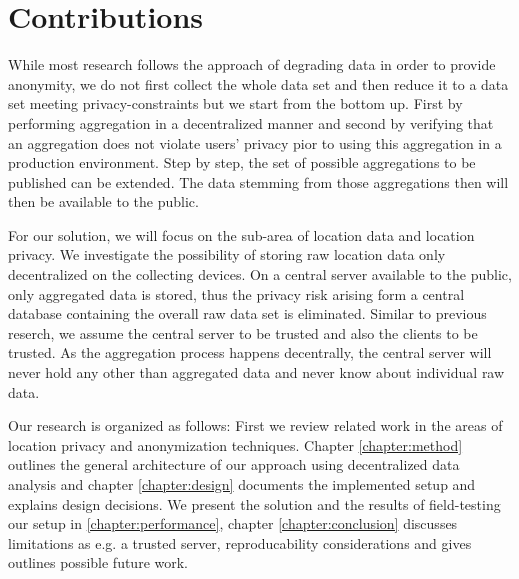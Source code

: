 \section{Contributions}
While most research follows the approach of degrading data in order to provide anonymity, we do not first collect the whole data set and then reduce it to a data set meeting privacy-constraints but we start from the bottom up. First by performing aggregation in a decentralized manner and second by verifying that an aggregation does not violate users' privacy pior to using this aggregation in a production environment. Step by step, the set of possible aggregations to be published can be extended. The data stemming from those aggregations then will then be available to the public. 

For our solution, we will focus on the sub-area of location data and location privacy.
We investigate the possibility of storing raw location data only decentralized on the collecting devices. On a central server available to the public, only aggregated data is stored, thus the privacy risk arising form a central database containing the overall raw data set is eliminated. Similar to previous reserch, we assume the central server to be trusted and also the clients to be trusted. As the aggregation process happens decentrally, the central server will never hold any other than aggregated data and never know about individual raw data. 

Our research is organized as follows: First we review related work in the areas of location privacy and anonymization techniques.
Chapter \ref{chapter:method} outlines the general architecture of our approach using decentralized data analysis and chapter \ref{chapter:design} documents the implemented setup and explains design decisions. We present the solution and the results of field-testing our setup in \ref{chapter:performance}, chapter \ref{chapter:conclusion} discusses limitations as e.g. a trusted server, reproducability considerations and gives outlines possible future work.



